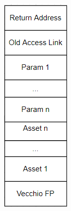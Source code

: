 \documentclass[12pt, a4paper]{report}
\begin{document}
\begin{figure}
    \includegraphics[width=0.9\linewidth]{rda.png}
    \centering
\end{figure}
\end{document}
